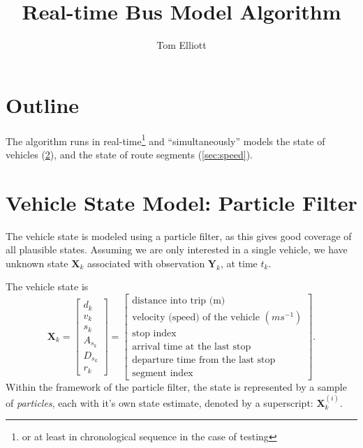 \documentclass[14paper,twoside]{article}
\title{Real-time Bus Model Algorithm}
\author{Tom Elliott}
\date{}
\newcommand{\bX}{\mathbf{X}}
\newcommand{\bY}{\mathbf{Y}}
\begin{document}
\maketitle

\section{Outline}
\label{sec:outline}

The algorithm runs in real-time\footnote{or at least in chronological sequence in the case of testing}
and ``simultaneously'' models the state of vehicles (\cref{sec:bus}),
and the state of route segments (\cref{sec:speed}).



\section{Vehicle State Model: Particle Filter}
\label{sec:bus}


The vehicle state is modeled using a particle filter, 
as this gives good coverage of all plausible states.
Assuming we are only interested in a single vehicle,
we have unknown state $\bX_k$ associated with observation $\bY_k$,
at time $t_k$.


The vehicle state is
\begin{equation}
  \label{eq:vehicle_state}
  \bX_k = 
  \begin{bmatrix}
    d_k \\ v_k \\ s_k \\ A_{s_k} \\ D_{s_k} \\ r_k
  \end{bmatrix} =
  \left[
    \begin{array}{l}
      \text{distance into trip (m)} \\
      \text{velocity (speed) of the vehicle } (ms^{-1}) \\
      \text{stop index} \\
      \text{arrival time at the last stop} \\
      \text{departure time from the last stop} \\
      \text{segment index}
    \end{array}
  \right].
\end{equation}
Within the framework of the particle filter, the state is represented by a sample of \emph{particles},
each with it's own state estimate, denoted by a superscript: $\bX_k^{(i)}$.
\end{document}
